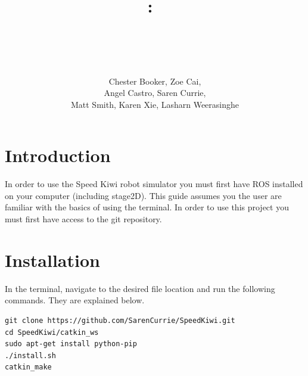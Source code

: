 \documentclass{article}
\title{
\vspace{2in}
\textmd{\textbf{\hmwkClass:\ \hmwkTitle}}\\
\normalsize\vspace{0.1in}\small{}\\
\vspace{0.1in}\large{\textit{\hmwkClassInstructor\ \hmwkClassTime}}
\vspace{3in}
}
\author{Chester Booker, Zoe Cai, \\
Angel Castro, Saren Currie, \\
Matt Smith, Karen Xie, Lasharn Weerasinghe}
\date{} %
\begin{document}
\maketitle



\newpage
\tableofcontents
\newpage

\section*{Introduction} %


In order to use the Speed Kiwi robot simulator you must first have ROS installed on your computer (including stage2D). This guide assumes you the user are familiar with the basics of using the terminal. In order to use this project you must first have access to the git repository.


\section{Installation}

In the terminal, navigate to the desired file location and run the following commands. They are explained below.

\begin{verbatim}
git clone https://github.com/SarenCurrie/SpeedKiwi.git
cd SpeedKiwi/catkin_ws
sudo apt-get install python-pip
./install.sh
catkin_make
\end{verbatim}
\end{document}
